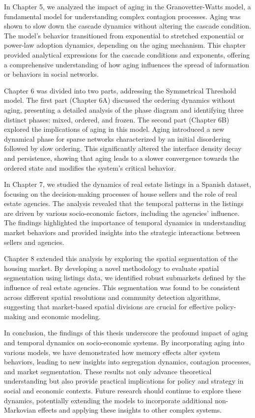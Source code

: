 In Chapter 5, we analyzed the impact of aging in the Granovetter-Watts model, a fundamental model for understanding complex contagion processes. Aging was shown to slow down the cascade dynamics without altering the cascade condition. The model's behavior transitioned from exponential to stretched exponential or power-law adoption dynamics, depending on the aging mechanism. This chapter provided analytical expressions for the cascade conditions and exponents, offering a comprehensive understanding of how aging influences the spread of information or behaviors in social networks.

Chapter 6 was divided into two parts, addressing the Symmetrical Threshold model. The first part (Chapter 6A) discussed the ordering dynamics without aging, presenting a detailed analysis of the phase diagram and identifying three distinct phases: mixed, ordered, and frozen. The second part (Chapter 6B) explored the implications of aging in this model. Aging introduced a new dynamical phase for sparse networks characterized by an initial disordering followed by slow ordering. This significantly altered the interface density decay and persistence, showing that aging leads to a slower convergence towards the ordered state and modifies the system's critical behavior.

In Chapter 7, we studied the dynamics of real estate listings in a Spanish dataset, focusing on the decision-making processes of house sellers and the role of real estate agencies. The analysis revealed that the temporal patterns in the listings are driven by various socio-economic factors, including the agencies' influence. The findings highlighted the importance of temporal dynamics in understanding market behaviors and provided insights into the strategic interactions between sellers and agencies.

Chapter 8 extended this analysis by exploring the spatial segmentation of the housing market. By developing a novel methodology to evaluate spatial segmentation using listings data, we identified robust submarkets defined by the influence of real estate agencies. This segmentation was found to be consistent across different spatial resolutions and community detection algorithms, suggesting that market-based spatial divisions are crucial for effective policy-making and economic modeling.

In conclusion, the findings of this thesis underscore the profound impact of aging and temporal dynamics on socio-economic systems. By incorporating aging into various models, we have demonstrated how memory effects alter system behaviors, leading to new insights into segregation dynamics, contagion processes, and market segmentation. These results not only advance theoretical understanding but also provide practical implications for policy and strategy in social and economic contexts. Future research should continue to explore these dynamics, potentially extending the models to incorporate additional non-Markovian effects and applying these insights to other complex systems.

